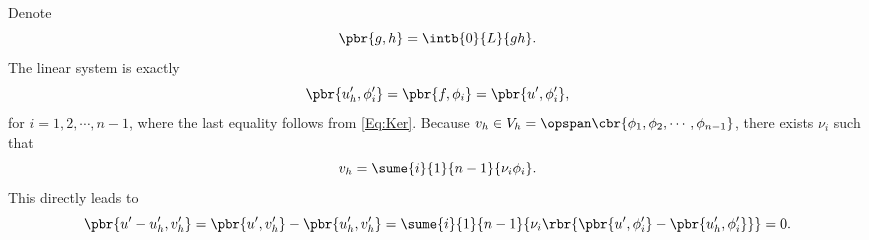 \documentclass[english, nochinese]{pkupaper}
\begin{document}
\begin{thmquestion}
\ 
\begin{thmproof}
Denote
\begin{equation}
\pbr{ g, h } = \intb{0}{L}{ g h }.
\end{equation}
The linear system is exactly
\begin{equation}
\pbr{ u_h', \phi_i' } = \pbr{ f, \phi_i } = \pbr{ u', \phi_i'},
\end{equation}
for $ i = 1, 2, \cdots, n - 1 $, where the last equality follows from \eqref{Eq:Ker}. Because $ v_h \in V_h = \opspan \cbr{ \phi_1, \phi_2, \cdots, \phi_{ n - 1 } } $, there exists $\nu_i$ such that
\begin{equation}
v_h = \sume{i}{1}{ n - 1 }{ \nu_i \phi_i }.
\end{equation}
This directly leads to
\begin{equation}
\pbr{ u' - u_h', v_h' } = \pbr{ u', v_h' } - \pbr{ u_h', v_h' } = \sume{i}{1}{ n - 1 }{ \nu_i \rbr{ \pbr{ u', \phi_i' } - \pbr{ u_h', \phi_i' } } } = 0.
\end{equation}

\sqed
\end{thmproof}
\end{thmquestion}
\end{document}

